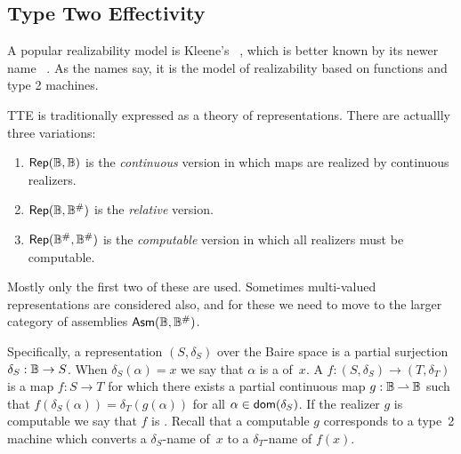 \subsection{Type Two Effectivity}
\label{sec:tte}

A popular realizability model is Kleene's~ , which is better known by its newer name ~. As the names say, it is the
model of realizability based on functions and type 2 machines. 

TTE is traditionally expressed as a theory of representations. There
are actuallly three variations:
%
\begin{enumerate}
\item $\mathsf{Rep}(\mathbb{B}, \mathbb{B})$ is the \emph{continuous} version in which
  maps are realized by continuous realizers.
\item $\mathsf{Rep}(\mathbb{B}, \mathbb{B}^{\#})$ is the \emph{relative} version.
\item $\mathsf{Rep}(\mathbb{B}^{\#}, \mathbb{B}^{\#})$ is the \emph{computable}
  version in which all realizers must be computable.
\end{enumerate}
%
Mostly only the first two of these are used. Sometimes multi-valued
representations are considered also, and for these we need to move to
the larger category of assemblies $\mathsf{Asm}(\mathbb{B}, \mathbb{B}^{\#})$.

Specifically, a representation $(S, \delta_S)$ over the Baire space is
a partial surjection $\delta_S : \mathbb{B} \to S$. When $\delta_S(\alpha)
= x$ we say that $\alpha$ is a  of~$x$. A
 $f :(S, \delta_S) \to (T,
\delta_T)$ is a map $f : S \to T$ for which there exists a partial
continuous map $g : \mathbb{B} \mathbin{\rightharpoonup} \mathbb{B}$ such that
$f(\delta_S(\alpha)) = \delta_T(g(\alpha))$ for all $\alpha \in
\mathsf{dom}(\delta_S)$. If the realizer $g$ is computable we say that $f$ is
. Recall that a computable $g$ corresponds
to a type~2 machine which converts a $\delta_S$-name of~$x$ to a
$\delta_T$-name of $f(x)$.

